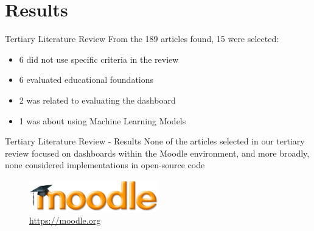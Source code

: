 \section{Results}

\begin{frame}{Tertiary Literature Review}
    From the 189 articles found, 15 were selected:
    \begin{itemize}[<alert@+>]\color{gray}
        \item 6 did not use specific criteria in the review
        \item 6 evaluated educational foundations
        \item 2 was related to evaluating the dashboard
        \item 1 was about using Machine Learning Models
    \end{itemize}
\end{frame}

\begin{frame}{Tertiary Literature Review - Results}
    None of the articles selected in our tertiary review focused on dashboards within the Moodle environment, and more broadly, none considered implementations in open-source code

    \begin{figure}[H]
        \centering
        \includegraphics[width=0.5\textwidth]{../../images/moodle.jpg}
        \\ \small \url{https://moodle.org}
    \end{figure}
\end{frame}



